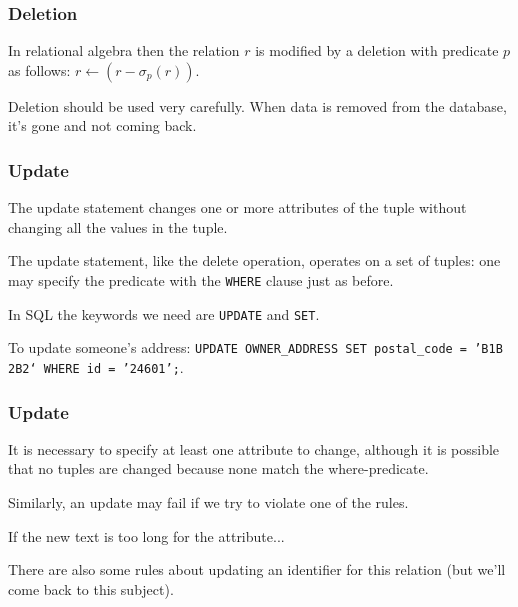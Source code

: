\begin{frame}
\frametitle{Deletion}


In relational algebra then the relation $r$ is modified by a deletion with predicate $p$ as follows: $r \leftarrow (r - \sigma_{p}( r ) )$.

Deletion should be used very carefully. When data is removed from the database, it's gone and not coming back.


\end{frame}



\begin{frame}
\frametitle{Update}

The update statement changes one or more attributes of the tuple without changing all the values in the tuple. 

The update statement, like the delete operation, operates on a set of tuples: one may specify the predicate with the \texttt{WHERE} clause just as before. 

In SQL the keywords we need are \texttt{UPDATE} and \texttt{SET}.  

To update someone's address: \texttt{UPDATE OWNER\_ADDRESS SET postal\_code = 'B1B 2B2` WHERE id = '24601';}. 


\end{frame}



\begin{frame}
\frametitle{Update}


It is necessary to specify at least one attribute to change, although it is possible that no tuples are changed because none match the where-predicate. 

Similarly, an update may fail if we try to violate one of the rules. 

If the new text is too long for the attribute...

There are also some rules about updating an identifier for this relation (but we'll come back to this subject).

\end{frame}




